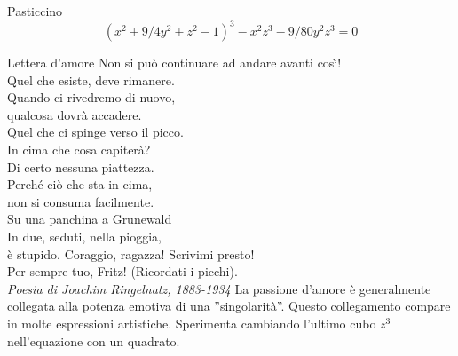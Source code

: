 \begin{surferPage}{Pasticcino}
\[(x^2+ 9/4y^2	+ z^2- 1)^3- x^2z^3	- 9/80y^2z^3	= 0\]

\singlespacing
Lettera d'amore
\singlespacing
Non si pu\`o continuare ad andare avanti cos\`{\i}!\\
Quel che esiste, deve rimanere.\\
Quando ci rivedremo di nuovo,\\
qualcosa dovr\`a accadere.\\
Quel che ci spinge verso il picco.\\
In cima che cosa capiter\`a?\\
Di certo nessuna piattezza.\\
Perch\'e ci\`o che sta in cima,\\
non si consuma facilmente.\\
Su una panchina a Grunewald\\
In due, seduti, nella pioggia,\\
\`e stupido. Coraggio, ragazza! Scrivimi presto!\\
Per sempre tuo, Fritz! (Ricordati i picchi).\\
{\it Poesia di Joachim Ringelnatz, 1883-1934}
\singlespacing
La passione d'amore \`e generalmente collegata alla potenza emotiva di una ''singolarit\`a''. Questo collegamento compare in molte espressioni artistiche.
\singlespacing
Sperimenta cambiando l'ultimo cubo $z^3$ nell'equazione con un quadrato.
\end{surferPage}
